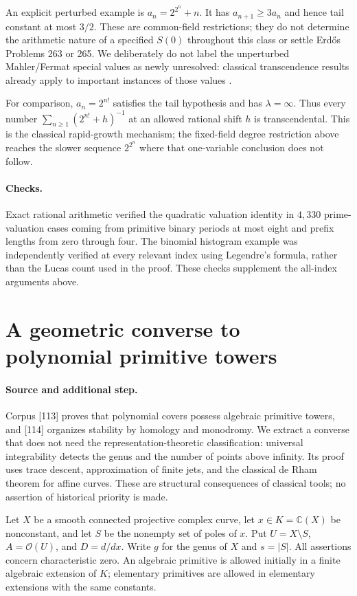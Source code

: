 \documentclass[11pt,a4paper]{article}
\theoremstyle{definition}
\theoremstyle{remark}
\numberwithin{equation}{section}
\begin{document}
An explicit perturbed example is $a_n=2^{2^n}+n$. It has
$a_{n+1}\ge3a_n$ and hence tail constant at most $3/2$.
These are common-field restrictions; they do not determine the
arithmetic nature of a specified $S(0)$ throughout this class or
settle Erd\H{o}s Problems 263 or 265. We deliberately do not label
the unperturbed Mahler/Fermat special values as newly unresolved:
classical transcendence results already apply to important instances
of those values \cite{Coons2011}.

For comparison, $a_n=2^{n!}$ satisfies the tail hypothesis and has
$\lambda=\infty$. Thus every number
$\sum_{n\ge1}(2^{n!}+h)^{-1}$ at an allowed rational shift $h$ is
transcendental. This is the classical rapid-growth mechanism; the
fixed-field degree restriction above reaches the slower sequence
$2^{2^n}$ where that one-variable conclusion does not follow.

\paragraph{Checks.}
Exact rational arithmetic verified the quadratic valuation identity
in $4,330$ prime-valuation cases coming from primitive binary periods at
most eight and prefix lengths from zero through four.  The binomial
histogram example was independently verified at every relevant index
using Legendre's formula, rather than the Lucas count used in the
proof.  These checks supplement the all-index arguments above.


\section{A geometric converse to polynomial primitive towers}
\label{sec:geometry}

\paragraph{Source and additional step.}
Corpus [113] proves that polynomial covers possess algebraic primitive
towers, and [114] organizes stability by homology and monodromy.  We
extract a converse that does not need the representation-theoretic
classification: universal integrability detects the genus and the
number of points above infinity.  Its proof uses trace descent,
approximation of finite jets, and the classical de Rham theorem for
affine curves.  These are structural consequences of classical tools;
no assertion of historical priority is made.

Let $X$ be a smooth connected projective complex curve, let
$x\in K=\mathbb C(X)$ be nonconstant, and let $S$ be the nonempty set
of poles of $x$. Put $U=X\setminus S$, $A=\mathcal O(U)$, and
$D=d/dx$. Write $g$ for the genus of $X$ and $s=|S|$.
All assertions concern characteristic zero. An algebraic primitive is
allowed initially in a finite algebraic extension of $K$; elementary
primitives are allowed in elementary extensions with the same constants.
\end{document}
